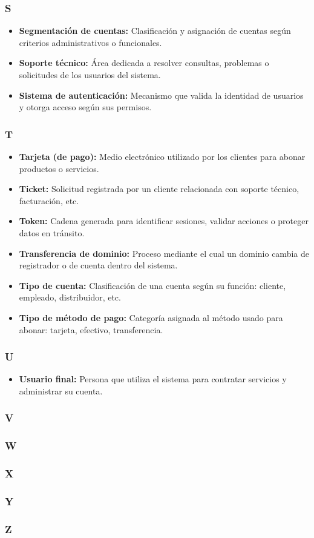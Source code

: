 \subsubsection*{S}
\begin{itemize}
    \item \textbf{Segmentación de cuentas:} Clasificación y asignación de cuentas según criterios administrativos o funcionales.
    \item \textbf{Soporte técnico:} Área dedicada a resolver consultas, problemas o solicitudes de los usuarios del sistema.
    \item \textbf{Sistema de autenticación:} Mecanismo que valida la identidad de usuarios y otorga acceso según sus permisos.
\end{itemize}

\subsubsection*{T}
\begin{itemize}
\item \textbf{Tarjeta (de pago):} Medio electrónico utilizado por los clientes para abonar productos o servicios.
\item \textbf{Ticket:} Solicitud registrada por un cliente relacionada con soporte técnico, facturación, etc.
\item \textbf{Token:} Cadena generada para identificar sesiones, validar acciones o proteger datos en tránsito.
\item \textbf{Transferencia de dominio:} Proceso mediante el cual un dominio cambia de registrador o de cuenta dentro del sistema.
\item \textbf{Tipo de cuenta:} Clasificación de una cuenta según su función: cliente, empleado, distribuidor, etc.
\item \textbf{Tipo de método de pago:} Categoría asignada al método usado para abonar: tarjeta, efectivo, transferencia.
\end{itemize}

\subsubsection*{U}
\begin{itemize}
\item \textbf{Usuario final:} Persona que utiliza el sistema para contratar servicios y administrar su cuenta.
\end{itemize}

\subsubsection*{V}

\subsubsection*{W}

\subsubsection*{X}

\subsubsection*{Y}

\subsubsection*{Z}
